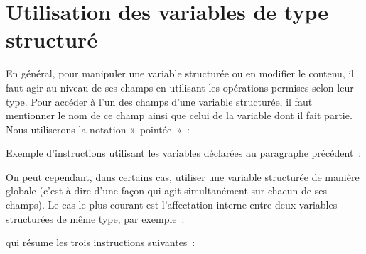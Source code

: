 
\section{Utilisation des variables de type structuré}

	En général, pour manipuler une variable
	structurée ou en modifier le contenu, il faut agir au niveau de ses
	champs en utilisant les opérations permises selon leur type. Pour
	accéder à l’un des champs d’une variable structurée, il faut mentionner
	le nom de ce champ ainsi que celui de la variable dont il fait partie.
	Nous utiliserons la notation «~pointée~»~:


	Exemple d’instructions utilisant les variables
	déclarées au paragraphe précédent~:


	On peut cependant, dans certains cas, utiliser
	une variable structurée de manière globale (c’est-à-dire d’une façon
	qui agit simultanément sur chacun de ses champs). Le cas le plus
	courant est l’affectation interne entre deux variables structurées de
	même type, par exemple~:


	qui résume les trois instructions suivantes~:


